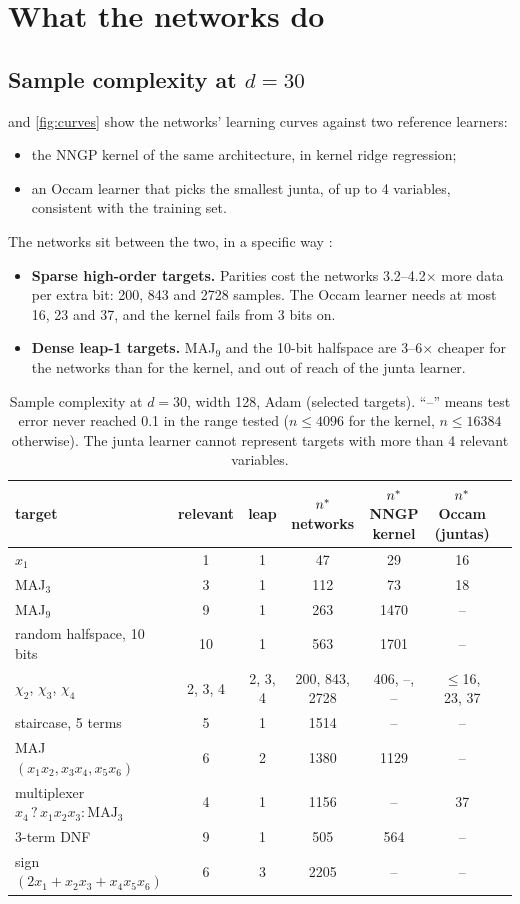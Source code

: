 \section{What the networks do}\label{sec:networks}

\subsection{Sample complexity at $d=30$}

 and \cref{fig:curves} show the networks' learning curves against two reference learners:
\begin{itemize}
\item the NNGP kernel \cite{lee2018nngp} of the same architecture, in kernel ridge regression;
\item an Occam learner that picks the smallest junta, of up to 4 variables, consistent with the training set.
\end{itemize}
The networks sit between the two, in a specific way :
\begin{itemize}
\item \textbf{Sparse high-order targets.} Parities cost the networks 3.2–4.2$\times$ more data per extra bit: 200, 843 and 2728 samples. The Occam learner needs at most 16, 23 and 37, and the kernel fails from 3 bits on.
\item \textbf{Dense leap-1 targets.} MAJ$_9$ and the 10-bit halfspace are 3–6$\times$ cheaper for the networks than for the kernel, and out of reach of the junta learner.
\end{itemize}

\begin{table}[t]
\centering\footnotesize\setlength{\tabcolsep}{4pt}
\begin{tabular}{lcccccc}
\toprule
target & relevant & leap & $n^{*}$ networks & $n^{*}$ NNGP kernel & $n^{*}$ Occam (juntas)\\
\midrule
$x_1$ & 1 & 1 & 47 & 29 & 16\\
MAJ$_3$ & 3 & 1 & 112 & 73 & 18\\
MAJ$_9$ & 9 & 1 & 263 & 1470 & --\\
random halfspace, 10 bits & 10 & 1 & 563 & 1701 & --\\
$\chi_2$, $\chi_3$, $\chi_4$ & 2, 3, 4 & 2, 3, 4 & 200, 843, 2728 & 406, --, -- & $\le$16, 23, 37\\
staircase, 5 terms & 5 & 1 & 1514 & -- & --\\
MAJ$(x_1x_2,x_3x_4,x_5x_6)$ & 6 & 2 & 1380 & 1129 & --\\
multiplexer $x_4\,?\,x_1x_2x_3:\mathrm{MAJ}_3$ & 4 & 1 & 1156 & -- & 37\\
3-term DNF & 9 & 1 & 505 & 564 & --\\
sign$(2x_1+x_2x_3+x_4x_5x_6)$ & 6 & 3 & 2205 & -- & --\\
\bottomrule
\end{tabular}
\caption{Sample complexity at $d=30$, width 128, Adam (selected targets). ``--'' means test error never reached 0.1 in the range tested ($n\le4096$ for the kernel, $n\le16384$ otherwise). The junta learner cannot represent targets with more than 4 relevant variables.}
\label{tab:nstar30}
\end{table}

